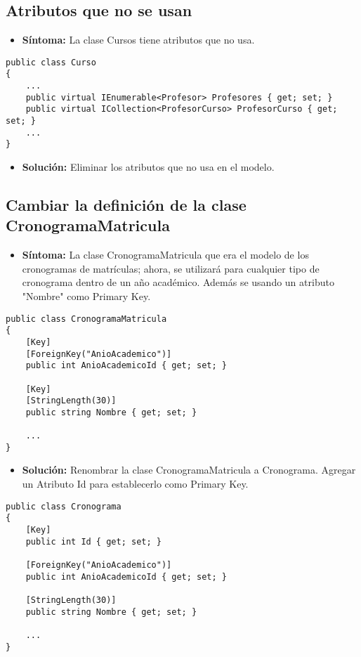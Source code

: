 \subsection{Atributos que no se usan}
\begin{itemize}
	\item \textbf{Síntoma:} La clase Cursos tiene atributos que no usa.
\end{itemize}

\begin{lstlisting}[language={[Sharp]C}]
public class Curso
{      
	...
	public virtual IEnumerable<Profesor> Profesores { get; set; }	
	public virtual ICollection<ProfesorCurso> ProfesorCurso { get; set; }
	...
}

\end{lstlisting}

\begin{itemize}
	\item \textbf{Solución:} Eliminar los atributos que no usa en el modelo.
\end{itemize}


\subsection{Cambiar la definición de la clase CronogramaMatricula}
\begin{itemize}
	\item \textbf{Síntoma:} La clase CronogramaMatricula que era el modelo de los cronogramas de matrículas; ahora, se utilizará para cualquier tipo de cronograma dentro de un año académico. Además se usando un atributo "Nombre" como Primary Key.
\end{itemize}

\begin{lstlisting}[language={[Sharp]C}]
public class CronogramaMatricula
{
	[Key]
	[ForeignKey("AnioAcademico")]
	public int AnioAcademicoId { get; set; }
	
	[Key]
	[StringLength(30)]
	public string Nombre { get; set; }
	
	...
}
\end{lstlisting}

\begin{itemize}
	\item \textbf{Solución:} Renombrar la clase CronogramaMatricula a Cronograma. Agregar un Atributo Id para establecerlo como Primary Key.
\end{itemize}
\begin{lstlisting}[language={[Sharp]C}]
public class Cronograma
{
	[Key]
	public int Id { get; set; }

	[ForeignKey("AnioAcademico")]
	public int AnioAcademicoId { get; set; }
	
	[StringLength(30)]
	public string Nombre { get; set; }
	
	...
}
\end{lstlisting}